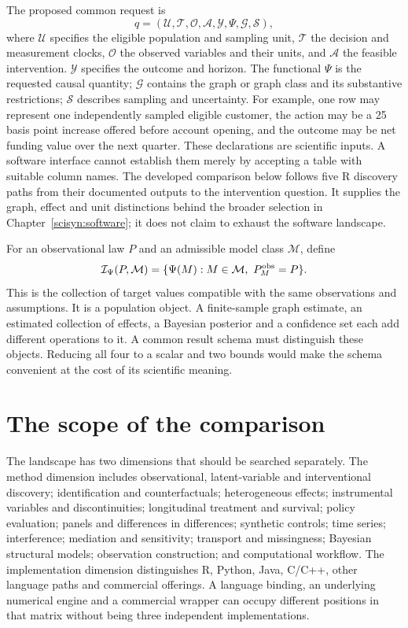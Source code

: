 The proposed common request is
\begin{equation}
 q=(\mathcal U,\mathcal T,\mathcal O,\mathcal A,\mathcal Y,
       \Psi,\mathcal G,\mathcal S),
 \label{exec13:request}
\end{equation}
where $\mathcal U$ specifies the eligible population and sampling unit,
$\mathcal T$ the decision and measurement clocks, $\mathcal O$ the observed
variables and their units, and $\mathcal A$ the feasible intervention.
$\mathcal Y$ specifies the outcome and horizon. The functional $\Psi$ is the
requested causal quantity; $\mathcal G$ contains the graph or graph class and
its substantive restrictions; $\mathcal S$ describes sampling and uncertainty.
For example, one row may represent one independently sampled eligible
customer, the action may be a 25 basis point increase offered before account
opening, and the outcome may be net funding value over the next quarter.
These declarations are scientific inputs. A software interface cannot establish
them merely by accepting a table with suitable column names. The developed
comparison below follows five R discovery paths from their documented outputs
to the intervention question. It supplies the graph, effect and unit distinctions
behind the broader selection in Chapter~\ref{scisyn:software}; it does not
claim to exhaust the software landscape.

For an observational law $P$ and an admissible model class $\mathcal M$, define
\begin{equation}
 \mathcal I_\Psi(P,\mathcal M)
 =\{\Psi(M):M\in\mathcal M,\ P_M^{\rm obs}=P\}.
 \label{exec13:identified-set}
\end{equation}
This is the collection of target values compatible with the same observations
and assumptions. It is a population object. A finite-sample graph estimate,
an estimated collection of effects, a Bayesian posterior and a confidence set
each add different operations to it. A common result schema must distinguish
these objects. Reducing all four to a scalar and two bounds would make the
schema convenient at the cost of its scientific meaning.

\section{The scope of the comparison}

The landscape has two dimensions that should be searched separately. The
method dimension includes observational, latent-variable and interventional
discovery; identification and counterfactuals; heterogeneous effects;
instrumental variables and discontinuities; longitudinal treatment and survival;
policy evaluation; panels and differences in differences; synthetic controls;
time series; interference; mediation and sensitivity; transport and missingness;
Bayesian structural models; observation construction; and computational
workflow. The implementation dimension distinguishes R, Python, Java,
C/C++, other language paths and commercial offerings. A language binding,
an underlying numerical engine and a commercial wrapper can occupy different
positions in that matrix without being three independent implementations.

